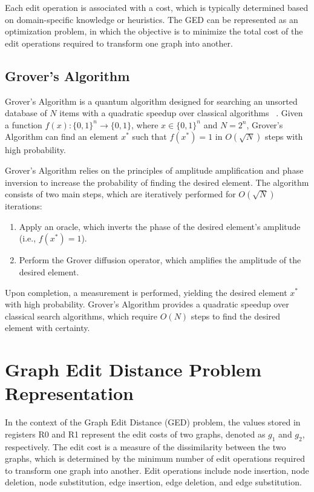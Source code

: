 Each edit operation is associated with a cost, which is typically determined based on domain-specific knowledge or heuristics. The GED can be represented as an optimization problem, in which the objective is to minimize the total cost of the edit operations required to transform one graph into another.

\subsection{Grover's Algorithm}

Grover's Algorithm is a quantum algorithm designed for searching an unsorted database of $N$ items with a quadratic speedup over classical algorithms ~\cite{grover1996fast}. Given a function $f(x) : \{0, 1\}^n \rightarrow \{0, 1\}$, where $x \in \{0, 1\}^n$ and $N = 2^n$, Grover's Algorithm can find an element $x^*$ such that $f(x^*) = 1$ in $O(\sqrt{N})$ steps with high probability.

Grover's Algorithm relies on the principles of amplitude amplification and phase inversion to increase the probability of finding the desired element. The algorithm consists of two main steps, which are iteratively performed for $O(\sqrt{N})$ iterations:

\begin{enumerate}
    \item Apply an oracle, which inverts the phase of the desired element's amplitude (i.e., $f(x^*) = 1$).
    \item Perform the Grover diffusion operator, which amplifies the amplitude of the desired element.
\end{enumerate}

Upon completion, a measurement is performed, yielding the desired element $x^*$ with high probability. Grover's Algorithm provides a quadratic speedup over classical search algorithms, which require $O(N)$ steps to find the desired element with certainty.

\section{Graph Edit Distance Problem Representation}
In the context of the Graph Edit Distance (GED) problem, the values stored in registers R0 and R1 represent the edit costs of two graphs, denoted as $g_1$ and $g_2$, respectively. The edit cost is a measure of the dissimilarity between the two graphs, which is determined by the minimum number of edit operations required to transform one graph into another. Edit operations include node insertion, node deletion, node substitution, edge insertion, edge deletion, and edge substitution.

